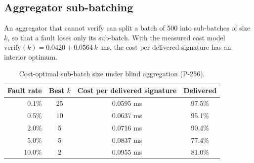 \subsection{Aggregator sub-batching}
An aggregator that cannot verify can split a batch of 500 into sub-batches of size $k$, so that a fault
loses only its sub-batch. With the measured cost model $\mathrm{verify}(k)=0.0420+0.0564\,k$~ms, the
cost per delivered signature has an interior optimum.

\begin{table}[ht]
\centering\small
\caption{Cost-optimal sub-batch size under blind aggregation (P-256).}\label{tab:subbatch}
\begin{tabular}{rccc}
\toprule
Fault rate & Best $k$ & Cost per delivered signature & Delivered \\
\midrule
0.1\% & 25 & 0.0595 ms & 97.5\% \\
0.5\% & 10 & 0.0637 ms & 95.1\% \\
2.0\% & 5 & 0.0716 ms & 90.4\% \\
5.0\% & 5 & 0.0837 ms & 77.4\% \\
10.0\% & 2 & 0.0955 ms & 81.0\% \\
\bottomrule
\end{tabular}
\end{table}
